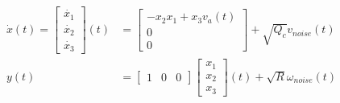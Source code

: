 	\begin{tcolorbox}[title=In continuous nonlinear stochastic system matrix form]
		\begin{equation}
			\begin{split}
					\dot{x}(t) =
					\begin{bmatrix}
						\dot{x_1} \\
						\dot{x_2} \\
						\dot{x_3} 
					\end{bmatrix}(t) &=
					\begin{bmatrix}
						-x_2 x_1 + x_3 v_a(t) \\
						0                     \\
						0                     
					\end{bmatrix} +\sqrt{Q_c}v_{noise}(t)\\
					y(t) &= 
					\begin{bmatrix}
						1 & 0 & 0 
					\end{bmatrix}
					\begin{bmatrix}
						x_1 \\
						x_2 \\
						x_3 
					\end{bmatrix}(t)+\sqrt{R}\omega_{noise}(t)
			\end{split}
			\label{dcmotorideq4}
		\end{equation}
	\end{tcolorbox}
	
